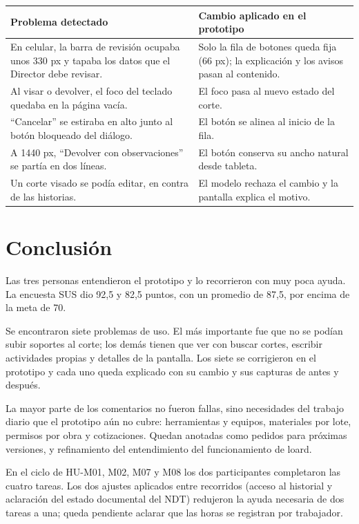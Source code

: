 \documentclass[11pt]{article}
\begin{document}
\begin{longtable}{>{\raggedright\arraybackslash}p{7.4cm} >{\raggedright\arraybackslash}p{7.9cm}}
\toprule \textbf{Problema detectado} & \textbf{Cambio aplicado en el prototipo} \\ \midrule \endhead
\bottomrule \endfoot
En celular, la barra de revisión ocupaba unos 330 px y tapaba los datos que el Director debe revisar. & Solo la fila de botones queda fija (66 px); la explicación y los avisos pasan al contenido. \\
Al visar o devolver, el foco del teclado quedaba en la página vacía. & El foco pasa al nuevo estado del corte. \\
``Cancelar'' se estiraba en alto junto al botón bloqueado del diálogo. & El botón se alinea al inicio de la fila. \\
A 1440 px, ``Devolver con observaciones'' se partía en dos líneas. & El botón conserva su ancho natural desde tableta. \\
Un corte visado se podía editar, en contra de las historias. & El modelo rechaza el cambio y la pantalla explica el motivo. \\
\end{longtable}

\section{Conclusión}

Las tres personas entendieron el prototipo y lo recorrieron con muy poca ayuda. La encuesta SUS dio
92,5 y 82,5 puntos, con un promedio de 87,5, por encima de la meta de 70.

Se encontraron siete problemas de uso. El más importante fue que no se podían subir soportes
al corte; los demás tienen que ver con buscar cortes, escribir actividades propias y detalles
de la pantalla. Los siete se corrigieron en el prototipo y cada uno queda explicado con su cambio y sus
capturas de antes y después.

La mayor parte de los comentarios no fueron fallas, sino necesidades del trabajo diario que
el prototipo aún no cubre: herramientas y equipos, materiales por lote, permisos por obra y
cotizaciones. Quedan anotadas como pedidos para próximas versiones, y refinamiento del entendimiento del funcionamiento de loard.

En el ciclo de HU-M01, M02, M07 y M08 los dos participantes completaron las cuatro tareas. Los dos ajustes aplicados entre recorridos (acceso al historial y aclaración del estado documental del NDT) redujeron la ayuda necesaria de dos tareas a una; queda pendiente aclarar que las horas se registran por trabajador.
\end{document}
